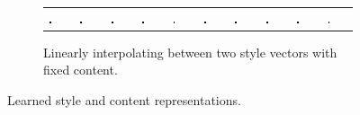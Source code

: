 {\begin{figure}
	\begin{subfigure}[t]{\textwidth}
	\begin{tabu} to \textwidth {XXXXXXXXXX}
		\includegraphics[width=0.09\textwidth]{tensors/sandc/interp/output10} &
		\includegraphics[width=0.09\textwidth]{tensors/sandc/interp/output11} &
		\includegraphics[width=0.09\textwidth]{tensors/sandc/interp/output12} &
		\includegraphics[width=0.09\textwidth]{tensors/sandc/interp/output13} &
		\includegraphics[width=0.09\textwidth]{tensors/sandc/interp/output14} &
		\includegraphics[width=0.09\textwidth]{tensors/sandc/interp/output15} &
		\includegraphics[width=0.09\textwidth]{tensors/sandc/interp/output16} &
		\includegraphics[width=0.09\textwidth]{tensors/sandc/interp/output17} &
		\includegraphics[width=0.09\textwidth]{tensors/sandc/interp/output18} &
		\includegraphics[width=0.09\textwidth]{tensors/sandc/interp/output19}
	\end{tabu}
	\caption{Linearly interpolating between two style vectors with fixed content.}
	\end{subfigure}
	\caption{Learned style and content representations.}
	\label{fig:sandc-interp}
\end{figure}

}
